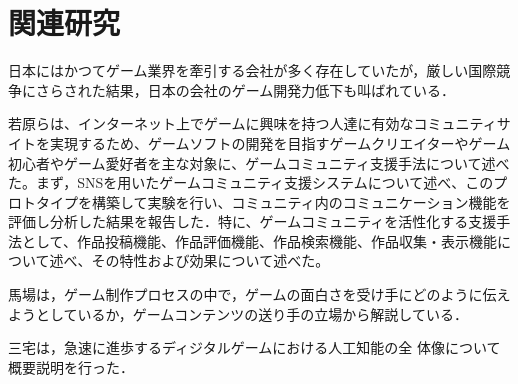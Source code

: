 \section{関連研究}

日本にはかつてゲーム業界を牽引する会社が多く存在していたが，厳しい国際競争にさらされた結果，日本の会社のゲーム開発力低下も叫ばれている．


若原らは、インターネット上でゲームに興味を持つ人達に有効なコミュニティサイトを実現するため、ゲームソフトの開発を目指すゲームクリエイターやゲーム初心者やゲーム愛好者を主な対象に、ゲームコミュニティ支援手法について述べた\cite{若原俊彦2009}。まず，SNSを用いたゲームコミュニティ支援システムについて述べ、このプロトタイプを構築して実験を行い、コミュニティ内のコミュニケーション機能を評価し分析した結果を報告した．特に、ゲームコミュニティを活性化する支援手法として、作品投稿機能、作品評価機能、作品検索機能、作品収集・表示機能について述べ、その特性および効果について述べた。 

馬場は，ゲーム制作プロセスの中で，ゲームの面白さを受け手にどのように伝えようとしているか，ゲームコンテンツの送り手の立場から解説している\cite{馬場哲治2005}．

三宅は，急速に進歩するディジタルゲームにおける人工知能の全
体像について概要説明を行った\cite{三宅陽一郎2015}．

